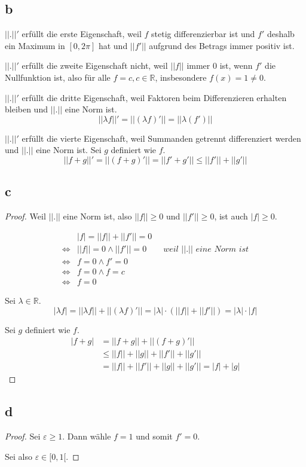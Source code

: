 \documentclass[10pt,a4paper]{article}
\begin{document}
\subsection*{b}

$||.||'$ erfüllt die erste Eigenschaft, weil $f$ stetig differenzierbar ist und $f'$ deshalb ein Maximum in $[0, 2\pi]$ hat und $||f'||$ aufgrund des Betrags immer positiv ist.

$||.||'$ erfüllt die zweite Eigenschaft nicht, weil $||f||$ immer $0$ ist, wenn $f'$ die Nullfunktion ist, also für alle $f = c, c \in \mathbb{R}$, insbesondere $f(x) = 1 \ne 0$.

$||.||'$ erfüllt die dritte Eigenschaft, weil Faktoren beim Differenzieren erhalten bleiben und $||.||$ eine Norm ist.
\begin{equation}
||\lambda f||' = ||(\lambda f)'|| = ||\lambda (f')||
\end{equation}

$||.||'$ erfüllt die vierte Eigenschaft, weil Summanden getrennt differenziert werden und $||.||$ eine Norm ist.
Sei $g$ definiert wie $f$.
\begin{equation}
||f + g||' = ||(f + g)'|| = ||f' + g'|| \le ||f'|| + ||g'||
\end{equation}

\subsection*{c}

\begin{proof}
Weil $||.||$ eine Norm ist, also $||f|| \ge 0$ und $||f'|| \ge 0$, ist auch $|f| \ge 0$.

\begin{align}
& |f| = ||f|| + ||f'|| = 0\\
\Leftrightarrow & ||f|| = 0 \land ||f'|| = 0 \qquad \textit{weil $||.||$ eine Norm ist}\\
\Leftrightarrow & f = 0 \land f' = 0\\
\Leftrightarrow & f = 0 \land f = c\\
\Leftrightarrow & f = 0
\end{align}

Sei $\lambda \in \mathbb{R}$.
\begin{equation}
|\lambda f| = ||\lambda f|| + ||(\lambda f)'|| = |\lambda| \cdot \left( ||f|| + ||f'|| \right) = |\lambda| \cdot |f|
\end{equation}

Sei $g$ definiert wie $f$.
\begin{align}
|f + g| & = ||f + g|| + ||(f + g)'||\\
& \le ||f|| + ||g|| + ||f'|| + ||g'||\\
& = ||f|| + ||f'|| + ||g|| + ||g'|| = |f| + |g|
\end{align}
\end{proof}

\subsection*{d}

\begin{proof}
Sei $\varepsilon \ge 1$.
Dann wähle $f = 1$ und somit $f' = 0$.

Sei also $\varepsilon \in [0, 1[$.
\end{proof}
\end{document}
